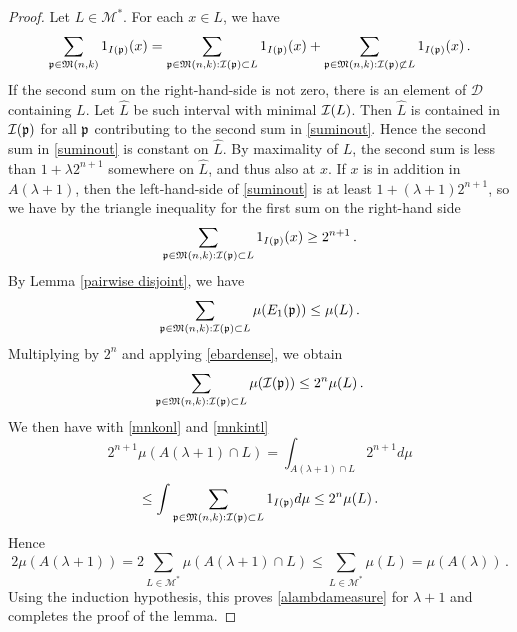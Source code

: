 \begin{proof}
Let $L\in \mathcal{M}^*$. For each $x\in L$, we have
\begin{equation}\label{suminout}
    \sum_{\fp \in {\mathfrak{M}}(n,k)} 1_{I(\fp)}(x)=
    \sum_{\fp \in {\mathfrak{M}}(n,k):\sc(\fp) \subset L} 1_{I(\fp)}(x)+
    \sum_{\fp \in {\mathfrak{M}}(n,k):\sc(\fp) \not \subset L} 1_{I(\fp)}(x)\, .
\end{equation}
If the second sum on the right-hand-side is not zero, there is
an element of $\mathcal{D}$  containing $L$.
Let $\hat{L}$ be such  interval with minimal $\sc(L)$. Then $\hat{L}$ is contained in $\sc(\fp)$ for all $\fp$
contributing to the second sum in
\eqref{suminout}.
Hence the second sum in \eqref{suminout} is constant on
$\hat{L}$.
By maximality of $L$, the second sum is less than  $1+\lambda 2^{n+1}$ somewhere on $\hat{L}$, and thus also
at $x$.
If $x$ is in addition in $A(\lambda+1)$, then
the left-hand-side of \eqref{suminout} is at least
$1+(\lambda+1) 2^{n+1}$, so we have by the triangle inequality for the first sum on the right-hand side
\begin{equation}\label{mnkonl}
\sum_{\fp \in {\mathfrak{M}}(n,k):\sc(\fp) \subset L} 1_{I(\fp)}(x)\ge 2^{n+1}\, .\end{equation}
By Lemma \ref{pairwise disjoint}, we have
\begin{equation}
\sum_{\fp \in {\mathfrak{M}}(n,k):\sc(\fp) \subset L} \mu({E_1}(\fp)) \leq \mu(L)\, .
\end{equation}
Multiplying by $2^n$ and applying  \eqref{ebardense}, we obtain
\begin{equation}\label{mnkintl}
    \sum_{\fp \in {\mathfrak{M}}(n,k):\sc(\fp) \subset L} \mu(\sc(\fp))  \leq 2^n \mu(L)\, .
\end{equation}
We then have with \eqref{mnkonl} and \eqref{mnkintl}
\begin{equation}
2^{n+1}\mu(A(\lambda+1)\cap L) =
    \int_{A(\lambda+1)\cap L} 2^{n+1} d\mu
\end{equation}
\begin{equation}
\le
    \int \sum_{\fp \in {\mathfrak{M}}(n,k):\sc(\fp) \subset L} 1_{I(\fp)} d\mu
\le 2^n \mu(L)\, .
\end{equation}
Hence
\begin{equation}
    2\mu(A(\lambda+1))=2\sum_{L\in \mathcal{M}^*}
\mu(A(\lambda+1)\cap L)\le
\sum_{L\in \mathcal{M}^*}\mu( L)= \mu(A(\lambda))\, .
\end{equation}
Using the induction hypothesis, this proves
\eqref{alambdameasure} for $\lambda+1$ and completes the proof of the lemma.
\end{proof}

